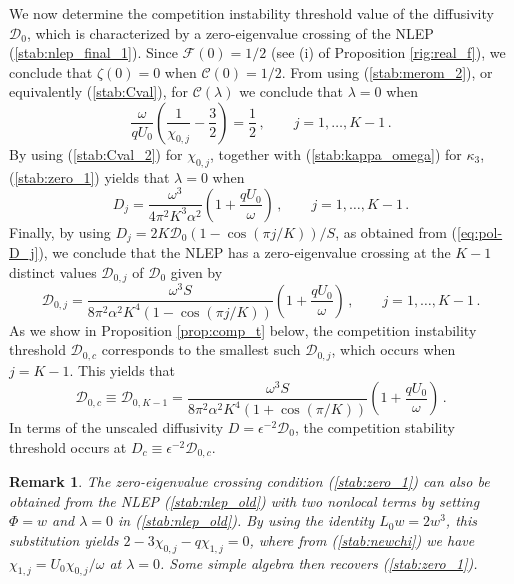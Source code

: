 \documentclass{article}%
\newtheorem{rem}[theorem]{Remark}
\begin{document}
We now determine the competition instability threshold value of the
diffusivity ${\mathcal D}_0$, which is characterized by a zero-eigenvalue 
crossing of the NLEP (\ref{stab:nlep_final_1}). Since
${\mathcal F}(0)={1/2}$ (see (i) of Proposition \ref{rig:real_f}), we
conclude that $\zeta(0)=0$ when ${\mathcal C}(0)={1/2}$. From using
(\ref{stab:merom_2}), or equivalently (\ref{stab:Cval}), for
${\mathcal C}(\lambda)$ we conclude that $\lambda=0$ when
\begin{equation}\label{stab:zero_1}
   \frac{\omega}{qU_0} \left( \frac{1}{\chi_{0,j}} - \frac{3}{2}\right)=
\frac{1}{2} \,, \qquad j=1,\ldots,K-1\,.
\end{equation}
By using (\ref{stab:Cval_2}) for $\chi_{0,j}$, together with
(\ref{stab:kappa_omega}) for $\kappa_3$, (\ref{stab:zero_1}) yields
that $\lambda=0$ when
\begin{equation}\label{stab:zero_2}
   D_j = \frac{\omega^3}{4\pi^2 K^3 \alpha^2} 
\left( 1+ \frac{qU_0}{\omega} \right) \,, \qquad j=1,\ldots,K-1 \,.
\end{equation}
Finally, by using $D_j=2 K {\mathcal D}_0{\left(1-\cos({\pi j/K})\right)/S}$, as
obtained from (\ref{eq:pol-D_j}), we conclude that the NLEP has a 
zero-eigenvalue crossing at the $K-1$ distinct values ${\mathcal D}_{0,j}$
of ${\mathcal D}_0$ given by
\begin{equation}\label{stab:zero_final}
    {\mathcal D}_{0,j} = \frac{\omega^3 S}{8 \pi^2 \alpha^2 K^4 
  \left(1 - \cos\left({\pi j/K}\right)\right)} \left( 1 + \frac{q U_0}{\omega}
  \right) \,, \qquad j=1,\ldots,K-1\,.
\end{equation}
As we show in Proposition \ref{prop:comp_t} below, the competition
instability threshold ${\mathcal D}_{0,c}$ corresponds to the
smallest such ${\mathcal D}_{0,j}$, which occurs when $j=K-1$. This yields that
\begin{equation}\label{stab:zero_d0min}
   {\mathcal D}_{0,c}\equiv {\mathcal D}_{0,K-1} = \frac{\omega^3 S}{8
     \pi^2 \alpha^2 K^4 \left(1 + \cos\left({\pi /K}\right)\right)}
   \left( 1 + \frac{q U_0}{\omega} \right) \,.
\end{equation}
In terms of the unscaled diffusivity $D=\epsilon^{-2}{\mathcal D}_0$,
the competition stability threshold occurs at
$D_{c}\equiv \epsilon^{-2}{\mathcal D}_{0,c}$.

\begin{rem}\label{stab:zero_two_nonlocal} The zero-eigenvalue crossing
condition (\ref{stab:zero_1}) can also be obtained from the NLEP
(\ref{stab:nlep_old}) with two nonlocal terms by setting $\Phi=w$ and
$\lambda=0$ in (\ref{stab:nlep_old}). By using the identity $L_0 w= 2
w^3$, this substitution yields $2-3\chi_{0,j} - q \chi_{1,j}=0$, where
from (\ref{stab:newchi}) we have $\chi_{1,j}={U_0 \chi_{0,j}/\omega}$
at $\lambda=0$. Some simple algebra then recovers (\ref{stab:zero_1}).
\end{rem}
\end{document}
